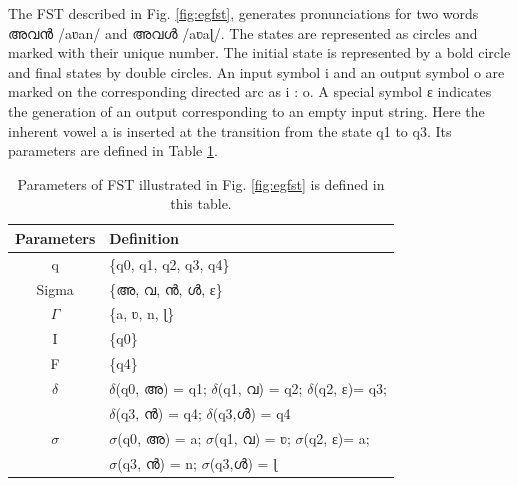 The FST described in Fig. \ref{fig:egfst}, generates pronunciations for two words {\mal അവൻ} /{\ipa aʋan}/ and {\mal  അവൾ} /{\ipa aʋaɭ}/. The states are represented as circles and marked with their unique number. The initial state is represented by a bold circle and final states by double circles. An input symbol i and an output symbol o are marked on the corresponding directed arc as i : o.  A special symbol {\ipa ɛ} indicates the generation of an output corresponding to an empty input string. Here the inherent vowel {\ipa a} is inserted at the transition from the state {\ipa q1} to {\ipa q3}. Its parameters are defined in Table \ref{tab:fstparam}.

\begin{table}[ht]
	\centering
	\caption{Parameters of FST illustrated in Fig. \ref{fig:egfst} is defined in this table.}
	\label{tab:fstparam}
	\begin{tabular}{c|l}
		\hline \hline
		\textbf{Parameters} & \textbf{Definition}                                                                                                             \\ \hline
		q                  & \{{\ipa q0, q1, q2, q3, q4}\}                                                                                                   \\
		\gls{Sigma}           & \{{\mal അ, വ, ൻ, ൾ}, {\ipa ɛ}\}                                                                                                 \\
		$\Gamma$            & \{{\ipa a, ʋ, n, ɭ}\}                                                                                                           \\
		I                   & \{{\ipa q0}\}                                                                                                                   \\
		F                   & \{{\ipa q4}\}                                                                                                                   \\
		$\delta$            & $\delta$({\ipa q0}, {\mal അ}) = {\ipa q1}; $\delta$({\ipa q1}, {\mal വ}) = {\ipa q2}; $\delta$({\ipa q2}, {\ipa ɛ})= {\ipa q3}; \\
		                    & $\delta$({\ipa q3}, {\mal ൻ}) = {\ipa q4};  $\delta$({\ipa q3},{\mal ൾ}) = {\ipa q4}                                            \\

		$\sigma$            & $\sigma$({\ipa q0}, {\mal അ}) = {\ipa a}; $\sigma$({\ipa q1}, {\mal വ}) = {\ipa ʋ}; $\sigma$({\ipa q2}, {\ipa ɛ})= {\ipa a};    \\
		                    & $\sigma$({\ipa q3}, {\mal ൻ}) = {\ipa n};  $\sigma$({\ipa q3},{\mal ൾ}) = {\ipa ɭ}                                              \\
		\hline

	\end{tabular}

\end{table}

